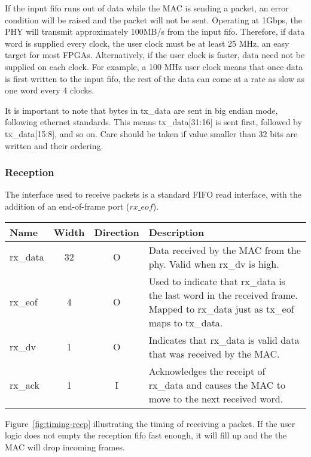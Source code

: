 \documentclass[11pt]{article}
\begin{document}
If the input fifo runs out of data while the MAC is sending a packet,
an error condition will be raised and the packet will not be sent.
Operating at 1Gbps, the PHY will transmit approximately 100MB/s from
the input fifo.  Therefore, if data word is supplied every clock, the
user clock must be at least 25 MHz, an easy target for most FPGAs.
Alternatively, if the user clock is faster, data need not be supplied
on each clock.  For example, a 100 MHz user clock means that once data
is first written to the input fifo, the rest of the data can come at a
rate as slow as one word every 4 clocks.

It is important to note that bytes in tx\_data are sent in big endian
mode, following ethernet standards.  This means tx\_data[31:16] is
sent first, followed by tx\_data[15:8], and so on.  Care should be
taken if value smaller than 32 bits are written and their ordering.

\subsubsection{Reception}

The interface used to receive packets is a standard FIFO read
interface, with the addition of an end-of-frame port ($rx\_eof$).

\vskip 12pt\noindent\begin{tabular}{p{0.85in}ccp{4.0in}}
\hline
Name & Width & Direction & Description \\
\hline

\hline rx\_data & 32 & O & Data received by the MAC from the
phy. Valid when rx\_dv is high. \\

\hline rx\_eof & 4 & O & Used to indicate that rx\_data is the last
word in the received frame. Mapped to rx\_data just as tx\_eof maps to
tx\_data. \\

\hline rx\_dv & 1 & O & Indicates that rx\_data is valid data that was
received by the MAC. \\

\hline rx\_ack & 1 & I & Acknowledges the receipt of rx\_data and
causes the MAC to move to the next received word. \\

\hline
\end{tabular}\vskip 12pt

\noindent Figure~\ref{fig:timing-recp} illustrating the timing of
receiving a packet.  If the user logic does not empty the reception
fifo fast enough, it will fill up and the the MAC will drop incoming frames.  
\end{document}
